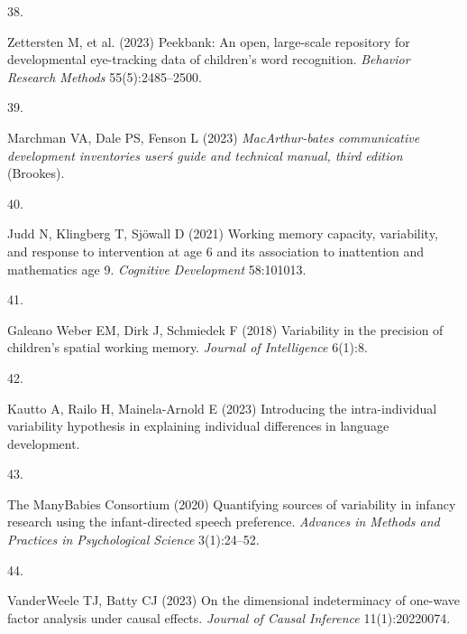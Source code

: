 \documentclass[9pt,twocolumn,twoside,]{pnas-new}
\newlength{\cslhangindent}
\newlength{\csllabelwidth}
\newenvironment{CSLReferences}[2] %
 {\begin{list}{}{%
  \setlength{\itemindent}{0pt}
  \setlength{\leftmargin}{0pt}
  \setlength{\parsep}{0pt}
  \ifodd #1
   \setlength{\leftmargin}{\cslhangindent}
   \setlength{\itemindent}{-1\cslhangindent}
  \fi
  \setlength{\itemsep}{#2\baselineskip}}}
 {\end{list}}
\newcommand{\CSLLeftMargin}[1]{\parbox[t]{\csllabelwidth}{#1}}
\newcommand{\CSLRightInline}[1]{\parbox[t]{\linewidth - \csllabelwidth}{#1}\break}
\begin{document}
\begin{CSLReferences}{0}{1}
\CSLLeftMargin{38. }%
\CSLRightInline{Zettersten M, et al. (2023) Peekbank: An open,
large-scale repository for developmental eye-tracking data of children's
word recognition. \emph{Behavior Research Methods} 55(5):2485--2500.}

\CSLLeftMargin{39. }%
\CSLRightInline{Marchman VA, Dale PS, Fenson L (2023)
\emph{MacArthur-bates communicative development inventories userś guide
and technical manual, third edition} (Brookes).}

\CSLLeftMargin{40. }%
\CSLRightInline{Judd N, Klingberg T, Sjöwall D (2021) Working memory
capacity, variability, and response to intervention at age 6 and its
association to inattention and mathematics age 9. \emph{Cognitive
Development} 58:101013.}

\CSLLeftMargin{41. }%
\CSLRightInline{Galeano Weber EM, Dirk J, Schmiedek F (2018) Variability
in the precision of children's spatial working memory. \emph{Journal of
Intelligence} 6(1):8.}

\CSLLeftMargin{42. }%
\CSLRightInline{Kautto A, Railo H, Mainela-Arnold E (2023) Introducing
the intra-individual variability hypothesis in explaining individual
differences in language development.}

\CSLLeftMargin{43. }%
\CSLRightInline{The ManyBabies Consortium (2020) {Quantifying sources of
variability in infancy research using the infant-directed speech
preference}. \emph{Advances in Methods and Practices in Psychological
Science} 3(1):24--52.}

\CSLLeftMargin{44. }%
\CSLRightInline{VanderWeele TJ, Batty CJ (2023) On the dimensional
indeterminacy of one-wave factor analysis under causal effects.
\emph{Journal of Causal Inference} 11(1):20220074.}

\end{CSLReferences}



% 
\end{document}
